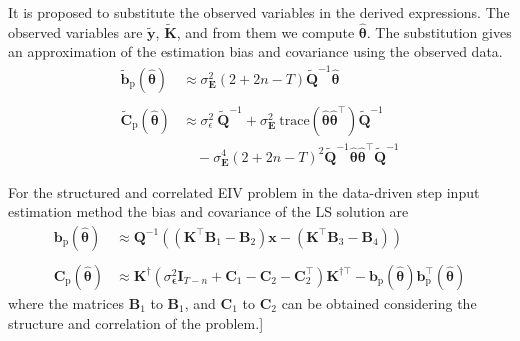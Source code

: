 \documentclass[presentation]{beamer}
\begin{document}
\begin{frame}[label={slide:statistical4}]{It is proposed to substitute the observed variables in the derived expressions.}
The observed variables are $\widetilde{\mathbf{y}}$, $\widetilde{\mathbf{K}}$, and from them we compute $\widehat{\bm{\theta}}$.
The substitution gives an approximation of the estimation bias and covariance using the observed data.
\begin{equation*} \begin{aligned} \widetilde{\mathbf{b}}_{\mathrm{p}} \left( \widehat{\bm{\theta}} \right) & \approx \sigma_{\mathbf{E}}^2 \left( 2 + 2n - T \right) \widetilde{\mathbf{Q}}^{-1} \widehat{\bm{\theta}} \\
\\
\widetilde{\mathbf{C}}_{\mathrm{p}} \left( \widehat{\bm{\theta}} \right) & \approx \sigma_\epsilon^2 \ \widetilde{\mathbf{Q}}^{-1} + \sigma_{\mathbf{E}}^2 \ \mathrm{trace} \left( \widehat{\bm{\theta}} \widehat{\bm{\theta}}^\top \right) \widetilde{\mathbf{Q}}^{-1} \\
&\quad - \sigma_{\mathbf{E}}^4 \left( 2 + 2n - T \right)^2 \widetilde{\mathbf{Q}}^{-1} \widehat{\bm{\theta}} \widehat{\bm{\theta}}^\top \widetilde{\mathbf{Q}}^{-1} \end{aligned} \end{equation*}
\end{frame}

\begin{frame}[label={slide:statistical5}]{For the structured and correlated EIV problem in the data-driven step input estimation method}
the bias and covariance of the LS solution are
\begin{equation*} \begin{aligned} \mathbf{b}_{\mathrm{p}} \left( \widehat{\bm{\theta}} \right) & \approx \mathbf{Q}^{-1} \left( \left( \mathbf{K}^\top \mathbf{B}_1 - \mathbf{B}_2 \right) \mathbf{x} - \left( \mathbf{K}^\top \mathbf{B}_3 - \mathbf{B}_4 \right) \right) \\ \\
\mathbf{C}_{\mathrm{p}} \left( \widehat{\bm{\theta}} \right) & \approx \mathbf{K}^\dagger \left( \sigma_{\bm{\epsilon}}^2 \mathbf{I}_{T-n} + \mathbf{C}_1 - \mathbf{C}_2 - \mathbf{C}_2^\top \right) \mathbf{K}^{\dagger \top} - \mathbf{b}_{\mathrm{p}} \left( \widehat{\bm{\theta}} \right) \mathbf{b}_{\mathrm{p}}^\top \left( \widehat{\bm{\theta}} \right)  \end{aligned} \end{equation*}
where the matrices $\mathbf{B}_1$ to $\mathbf{B}_1$, and $\mathbf{C}_1$ to $\mathbf{C}_2$ can be obtained considering the structure and correlation of the problem.] 
\end{frame}
\end{document}
